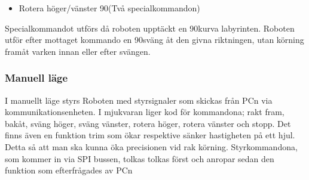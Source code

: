  \begin{itemize}
\item Rotera höger/vänster 90\degree (Två specialkommandon) 
\end{itemize}
Specialkommandot utförs då roboten upptäckt en 90\degree  kurva labyrinten. Roboten utför efter 
mottaget kommando en 90\degree sväng åt den givna riktningen, utan körning framåt varken innan 
eller efter svängen.




 

\subsubsection{Manuell läge}

I manuellt läge styrs Roboten med styrsignaler som skickas från PCn via 
kommunikationsenheten. I mjukvaran liger kod för kommandona; rakt 
fram, bakåt, sväng höger, sväng vänster, rotera höger, rotera vänster
och stopp. Det finns även en funktion trim som ökar respektive sänker 
hastigheten på ett hjul. Detta så att man ska kunna öka precisionen vid 
rak körning. Styrkommandona, som kommer in via SPI bussen, tolkas 
tolkas först och anropar sedan den funktion som efterfrågades av PCn



	

